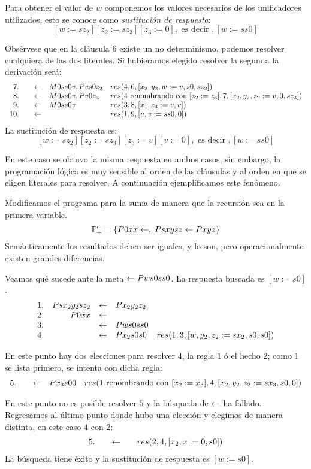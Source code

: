 \documentclass[11pt,letterpaper]{article}
\begin{document}
Para obtener el valor de $w$ componemos los valores necesarios de los
unificadores utilizados, esto se conoce como \emph{sustituci\'on de respuesta}:
$$ [w:=sz_2][z_2:=sz_3][z_3:=0], \mbox{ es decir }, [w:=ss0] $$

Obs\'ervese que en la cl\'ausula $6$ existe un no determinismo, podemos
resolver cualquiera de las dos literales. Si hubieramos elegido
resolver la segunda la derivaci\'on ser\'a:
\[
\ba{rrrll}
7. & & \pmi & M0ss0v, Pvs0z_2 & res(4,6,[x_2,y_2,w:=v,s0,sz_2]) \\
8. & & \pmi & M0ss0v, Pv0z_3  & 
  res(4\text{ renombrando con }[z_2:=z_3],7,[x_2,y_2,z_2:=v,0,sz_3] )\\
9. & & \pmi & M0ss0v & res(3,8,[x_1,z_3:=v,v])\\
10. & & \pmi &  & res(1,9,[u,v:=ss0,0])
\ea
\]
La sustituci\'on de respuesta es:
$$ [w:=sz_2][z_2:=sz_3][z_3:=v][v:=0], \mbox{ es decir }, [w:=ss0] $$
\eeje

En este caso se obtuvo la misma respuesta en ambos casos, sin embargo,
la programaci\'on l\'ogica es muy sensible al orden de las cl\'ausulas y al
orden en que se eligen literales para resolver. A continuaci\'on
ejemplificamos este fen\'omeno.

\beje
Modificamos el programa para la suma de manera que la recursi\'on sea en
la primera variable.
$$ \P_+'=\{P0xx\pmi,\;Psxysz \pmi Pxyz\} $$
Sem\'anticamente los resultados deben ser iguales, y lo son, pero
operacionalmente existen grandes diferencias. 

Veamos qu\'e sucede ante la meta $\pmi Pws0ss0$. La respuesta buscada es 
$[w:=s0]$.
\[
\ba{rrrll}
1. & Psx_2y_2sz_2 & \pmi & Px_2y_2z_2 & \\
2. & P0xx & \pmi  & \\
3.  & & \pmi & Pws0ss0 & \\
4. & & \pmi & Px_2s0s0 & res(1,3, [w,y_2,z_2:=sx_2,s0,s0])\\
\ea
\]

En este punto hay dos elecciones para resolver $4$, la regla $1$ \'o el
hecho $2$; como $1$ se lista primero, se intenta con dicha regla:
\[
\ba{rrrll}
5. & & \pmi & Px_3s00 & res(1\text{ renombrando con } [x_2:=x_3],4, 
[x_2,y_2,z_2:=sx_3,s0,0])\\
\ea
\]

En este punto no es posible resolver $5$ y la b\'usqueda de $\pmi$ ha
fallado. Regresamos al \'ultimo punto donde hubo una elecci\'on y elegimos
de manera distinta, en este caso $4$ con $2$:
\[
\ba{rrrll}
5. & & \pmi & & res(2,4, [x_2,x:=0,s0])\\
\ea
\]
La b\'usqueda tiene \'exito y la sustituci\'on de respuesta es $[w:=s0]$.
\eeje
\end{document}

